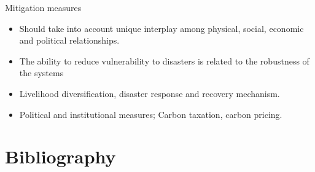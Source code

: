 \documentclass[
  ignorenonframetext,
  aspectratio=169]{beamer}
\providecommand{\tightlist}{%
  \setlength{\itemsep}{0pt}\setlength{\parskip}{0pt}}
\begin{document}
\begin{frame}{Mitigation measures}
\protect\hypertarget{mitigation-measures}{}
\begin{itemize}
\tightlist
\item
  Should take into account unique interplay among physical, social,
  economic and political relationships.
\item
  The ability to reduce vulnerability to disasters is related to the
  robustness of the systems
\item
  Livelihood diversification, disaster response and recovery mechanism.
\item
  Political and institutional measures; Carbon taxation, carbon pricing.
\end{itemize}
\end{frame}

\hypertarget{bibliography}{%
\section{Bibliography}\label{bibliography}}
\end{document}
